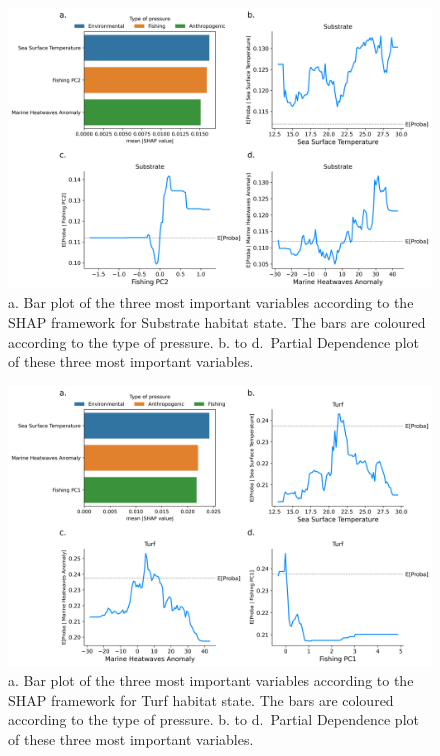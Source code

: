 \begin{figure}
\hypertarget{fig:chap3figS49}{%
\centering
\includegraphics{03-Chapitre3/figures/supplementary/04-pdp_Substrate.png}
\caption{a. Bar plot of the three most important variables according to
the SHAP framework for Substrate habitat state. The bars are coloured
according to the type of pressure. b. to d.~Partial Dependence plot of
these three most important variables.}\label{fig:chap3figS49}
}
\end{figure}

\begin{figure}
\hypertarget{fig:chap3figS50}{%
\centering
\includegraphics{03-Chapitre3/figures/supplementary/04-pdp_Turf.png}
\caption{a. Bar plot of the three most important variables according to
the SHAP framework for Turf habitat state. The bars are coloured
according to the type of pressure. b. to d.~Partial Dependence plot of
these three most important variables.}\label{fig:chap3figS50}
}
\end{figure}


\let\sectionmark\oldsectionmark

\captionsetup[figure]{list=yes}
\captionsetup[table]{list=yes}

\renewcommand{\thefigure}{\arabic{figure}}
\renewcommand{\thetable}{\arabic{table}}   


